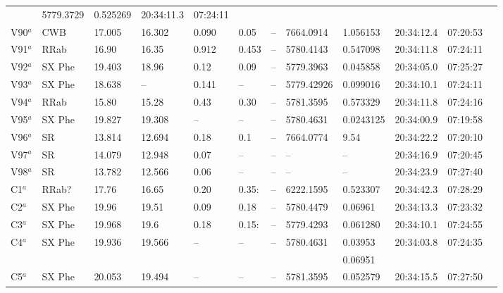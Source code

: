 \documentclass[journal]{rmaa}
\newcommand{\1}{\'{\i}}
\begin{document}
\begin{table*}
\begin{center}
\begin{tabular}{llllllllllll}
         & 5779.3729    &0.525269 & 20:34:11.3 &07:24:11\\
V90$^{a}$     &CWB &17.005   & 16.302 & 0.090 &0.05 &--
       &7664.0914    &1.056153  & 20:34:12.4 &07:20:53\\
V91$^{a}$      &RRab &16.90   & 16.35 & 0.912 &0.453 &--
       &5780.4143   &0.547098 & 20:34:11.8 &07:24:11\\
V92$^{a}$    &SX Phe &19.403   & 18.96 & 0.12 &0.09 &--
       &5779.3963  &0.045858 & 20:34:05.0 &07:25:27\\
V93$^{a}$      &SX Phe &18.638 &-- &0.141&--&--
       &5779.42926   &0.099016& 20:34:10.1 &07:24:11\\
V94$^{a}$    &RRab &15.80   &15.28 & 0.43 &0.30 &--
       &5781.3595  &0.573329&20:34:11.8  &07:24:16\\
V95$^{a}$    &SX Phe &19.827   &19.308  & --&-- &--
       &5780.4631  &0.0243125 &20:34:00.9 &07:19:58\\
V96$^{a}$      &SR & 13.814 & 12.694 &0.18&0.1&--
       &7664.0774   &9.54& 20:34:22.2 &07:20:10\\
V97$^{a}$    &SR &14.079   &12.948 & 0.07 &-- &--
       &--  &--&20:34:16.9&07:20:45 \\
V98$^{a}$    &SR & 13.782 &12.566 &0.06&-- &--
       &-- &-- &20:34:23.9&07:27:40\\


\hline
C1$^{a}$      &RRab? &17.76   &16.65 & 0.20 & 0.35:&--
       &6222.1595  &0.523307 & 20:34:42.3 &07:28:29\\
C2$^{a}$      &SX Phe &19.96   &19.51 & 0.09 & 0.18&--
       &5780.4479&0.06961 &20:34:13.3 &07:23:32\\
C3$^{a}$      &SX Phe &19.968   &19.6 & 0.18 & 0.15:&--
       &5779.4293   &0.061280 & 20:34:10.1 &07:24:55\\
C4$^{a}$      &SX Phe &19.936   &19.566 & -- & --&--
       &5780.4631&0.03953 &20:34:03.8 &07:24:35\\
              &       &         &      &     &   &
       &         &0.06951 &           &         \\
C5$^{a}$      &SX Phe &20.053   &19.494 & -- & --&--
       &5781.3595   &0.052579 &20:34:15.5&07:27:50\\

\hline
\end{tabular}
\raggedright
{}
\end{center}
\end{table*}
\end{document}
